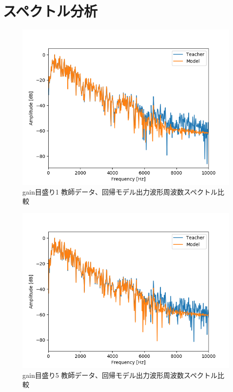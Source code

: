 \documentclass{jreport}		%
\begin{document}
\clearpage
\section{スペクトル分析}

\begin{figure}[htbp]
 \begin{center}
  \includegraphics[width=150mm]{gain1_fft_hikaku.png}
 \end{center}
 \caption{gain目盛り1 教師データ、回帰モデル出力波形周波数スペクトル比較}
 \label{fig:one}
\end{figure}

\begin{figure}[htbp]
 \begin{center}
  \includegraphics[width=150mm]{gain5_fft_hikaku.png}
 \end{center}
 \caption{gain目盛り5 教師データ、回帰モデル出力波形周波数スペクトル比較}
 \label{fig:one}
\end{figure}
\end{document}
